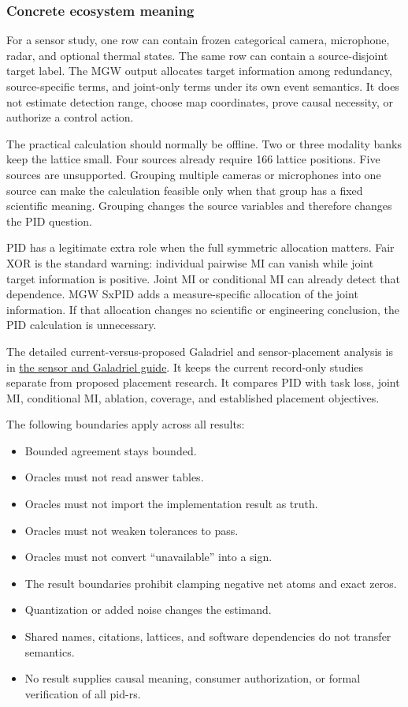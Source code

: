 \documentclass[
  11pt,
  a4paper,
]{article}
\providecommand{\tightlist}{%
  \setlength{\itemsep}{0pt}\setlength{\parskip}{0pt}}
\begin{document}
\subsubsection{Concrete ecosystem
meaning}\label{concrete-ecosystem-meaning}

For a sensor study, one row can contain frozen categorical camera,
microphone, radar, and optional thermal states. The same row can contain
a source-disjoint target label. The MGW output allocates target
information among redundancy, source-specific terms, and joint-only
terms under its own event semantics. It does not estimate detection
range, choose map coordinates, prove causal necessity, or authorize a
control action.

The practical calculation should normally be offline. Two or three
modality banks keep the lattice small. Four sources already require 166
lattice positions. Five sources are unsupported. Grouping multiple
cameras or microphones into one source can make the calculation feasible
only when that group has a fixed scientific meaning. Grouping changes
the source variables and therefore changes the PID question.

PID has a legitimate extra role when the full symmetric allocation
matters. Fair XOR is the standard warning: individual pairwise MI can
vanish while joint target information is positive. Joint MI or
conditional MI can already detect that dependence. MGW SxPID adds a
measure-specific allocation of the joint information. If that allocation
changes no scientific or engineering conclusion, the PID calculation is
unnecessary.

The detailed current-versus-proposed Galadriel and sensor-placement
analysis is in
\href{https://github.com/sepahead/pid-rs/blob/main/PID_SENSOR_PLACEMENT_AND_GALADRIEL_GUIDE.md}{the
sensor and Galadriel guide}. It keeps the current record-only studies
separate from proposed placement research. It compares PID with task
loss, joint MI, conditional MI, ablation, coverage, and established
placement objectives.

The following boundaries apply across all results:

\begin{itemize}
\tightlist
\item
  Bounded agreement stays bounded.
\item
  Oracles must not read answer tables.
\item
  Oracles must not import the implementation result as truth.
\item
  Oracles must not weaken tolerances to pass.
\item
  Oracles must not convert ``unavailable'' into a sign.
\item
  The result boundaries prohibit clamping negative net atoms and exact
  zeros.
\item
  Quantization or added noise changes the estimand.
\item
  Shared names, citations, lattices, and software dependencies do not
  transfer semantics.
\item
  No result supplies causal meaning, consumer authorization, or formal
  verification of all pid-rs.
\end{itemize}
\end{document}

